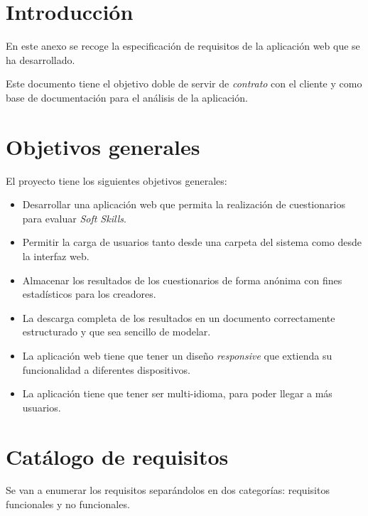 
\section{Introducción}

En este anexo se recoge la especificación de requisitos de la aplicación web que se ha desarrollado.

Este documento tiene el objetivo doble de servir de \textit{contrato} con el cliente y como base de documentación para el análisis de la aplicación.

\section{Objetivos generales}

El proyecto tiene los siguientes objetivos generales:

\begin{itemize}
	\item Desarrollar una aplicación web que permita la realización de cuestionarios para evaluar \textit{Soft Skills}.
	\item Permitir la carga de usuarios tanto desde una carpeta del sistema como desde la interfaz web.
	\item Almacenar los resultados de los cuestionarios de forma anónima con fines estadísticos para los creadores.
	\item La descarga completa de los resultados en un documento correctamente estructurado y que sea sencillo de modelar.
	\item La aplicación web tiene que tener un diseño \textit{responsive} que extienda su funcionalidad a diferentes dispositivos.
	\item La aplicación tiene que tener ser multi-idioma, para poder llegar a más usuarios.
\end{itemize}

\section{Catálogo de requisitos}

Se van a enumerar los requisitos separándolos en dos categorías: requisitos funcionales y no funcionales.

